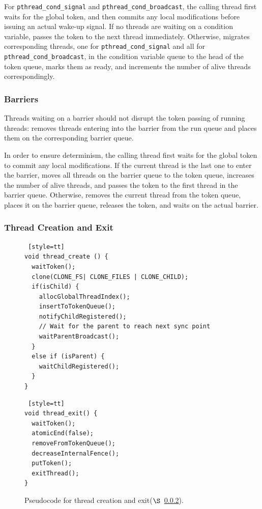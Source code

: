 For \texttt{pthread\_cond\_signal} and \texttt{pthread\_cond\_broadcast}, the calling thread first waits for the global token, and then commits any local modifications before issuing an actual wake-up signal. If no threads are waiting on a condition variable, \dthreads{} passes the token to the next thread immediately. Otherwise, \dthreads{} migrates corresponding threads, one for \texttt{pthread\_cond\_signal} and all for \texttt{pthread\_cond\_broadcast}, in the condition variable queue to the head of the token queue, marks them as ready, and increments the number of alive threads correspondingly. 


\subsubsection{Barriers}

\label{sec:barrierwait}

Threads waiting on a barrier should not disrupt the token passing of running threads: \dthreads{} removes threads entering into the barrier from the run queue and places them on the corresponding barrier queue.

In order to ensure determinism, the calling thread first waits for the global token to commit any local modifications. If the current thread is the last one to enter the barrier, \dthreads{} moves all threads on the barrier queue to the token queue, increases the number of alive threads, and passes the token to the first thread in the barrier queue. Otherwise, \dthreads{} removes the current thread from the token queue, places it on the barrier queue, releases the token, and waits on the actual barrier.


\subsubsection{Thread Creation and Exit}

\label{sec:threadcreation}

\begin{figure}
\begin{lstlisting} [style=tt]
void thread_create () {
  waitToken();
  clone(CLONE_FS| CLONE_FILES | CLONE_CHILD);
  if(isChild) {
    allocGlobalThreadIndex();
    insertToTokenQueue();
    notifyChildRegistered();
	// Wait for the parent to reach next sync point
    waitParentBroadcast();	
  }
  else if (isParent) {
    waitChildRegistered();
  }
}
\end{lstlisting}
\begin{lstlisting} [style=tt]
void thread_exit() {
  waitToken();
  atomicEnd(false);
  removeFromTokenQueue();
  decreaseInternalFence();
  putToken();
  exitThread(); 
}
\end{lstlisting}
\caption{Pseudocode for thread creation and exit($\S$~\ref{sec:threadcreation}).
\label{fig:threadcreation}
}
\end{figure}

